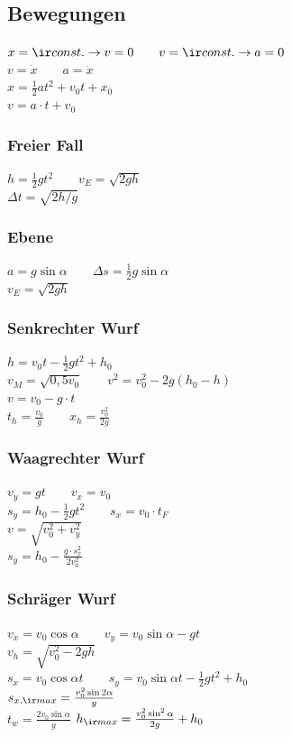 \documentclass[german]{latex4ei/latex4ei_sheet}
\begin{document}
\begin{sectionbox}

\subsection{Bewegungen}
$x={\ir const.} \rightarrow v=0 \qquad v={\ir const.} \rightarrow a=0$ \\
$v=\dot{x} \qquad a=\ddot{x}$ \\
$x=\frac{1}{2}at^2+v_0t+x_0$ \\
$v=a\cdot t + v_0$
\subsubsection{Freier Fall}
$h=\frac{1}{2}gt^2 \qquad v_E=\sqrt{2gh}$\\
$\Delta t = \sqrt{2h/g}$
\subsubsection{Ebene}
$a=g\sin \alpha \qquad \Delta s = \frac{1}{2}g\sin \alpha$\\
$v_E=\sqrt{2gh}$
\subsubsection{Senkrechter Wurf}
$h=v_0t-\frac{1}{2}gt^2+h_0$\\
$v_M=\sqrt{0,5v_0} \qquad v^2 = v_0^2-2g(h_0-h)$\\
$v=v_0-g\cdot t$\\
$t_h=\frac{v_0}{g} \qquad x_h=\frac{v_0^2}{2g}$
\subsubsection{Waagrechter Wurf}
$v_y=gt \qquad v_x = v_0$\\
$s_y=h_0-\frac{1}{2}gt^2 \qquad s_x=v_0\cdot t_F$\\
$v=\sqrt{v_0^2+v_y^2}$\\
$s_y=h_0-\frac{g\cdot s_x^2}{2v_0^2}$
\subsubsection{Schräger Wurf}
$v_x=v_0\cos \alpha \qquad v_y=v_0\sin \alpha -gt$\\
$v_h=\sqrt{v_0^2-2gh}$\\
$s_x=v_0\cos \alpha t \qquad s_y=v_0 \sin \alpha t - \frac{1}{2} gt^2 +h_0$\\
$s_{x,\ir max}=\frac{v_0^2 \sin{2\alpha}}{g}$\\
$t_w=\frac{2v_0\sin \alpha}{g}$ \qquad
$h_{\ir max}=\frac{v_0^2 \sin^2 \alpha}{2g}+h_0$
\end{sectionbox}
\end{document}
